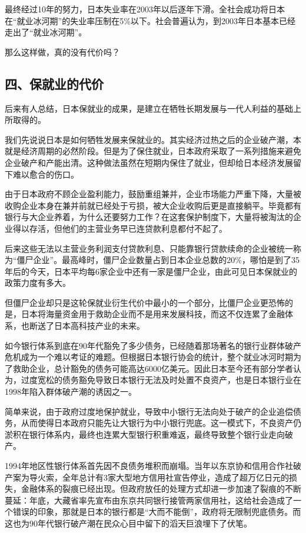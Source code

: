 最终经过10年的努力，日本失业率在2003年以后逐年下滑。全社会成功将日本在“就业冰河期”的失业率压制在5\%以下。社会普遍认为，到2003年日本基本已经走出了“就业冰河期”。

那么这样做，真的没有代价吗？

\subsection{四、保就业的代价}

后来有人总结，日本保就业的成果，是建立在牺牲长期发展与一代人利益的基础上所取得的。

我们先说说日本是如何牺牲发展来保就业的。其实经济过热之后的企业破产潮，本就是经济周期的必然阶段。但是为了保住就业，日本政府采取了一系列措施来避免企业破产和产能出清。这种做法虽然在短期内保住了就业，但却给日本经济发展留下难以愈合的伤口。

由于日本政府不顾企业盈利能力，鼓励重组兼并，企业市场能力严重下降，大量被收购企业本身在兼并前就已经处于亏损，被大企业收购后更是直接躺平。毕竟都有银行与大企业养着，为什么还要努力工作？在这套保护制度下，大量将被淘汰的企业得以存活，但他们的主营业务早已连贷款利息都付不起了。

后来这些无法以主营业务利润支付贷款利息、只能靠银行贷款续命的企业被统一称为“僵尸企业”。最高峰时，僵尸企业数量占到日本企业总数的20\%，哪怕是到了35年后的今天，日本平均每6家企业中还有一家是僵尸企业，由此可见日本保就业的政策力度有多大。

但僵尸企业却只是这轮保就业衍生代价中最小的一个部分，比僵尸企业更恐怖的是，日本将海量资金用于救助企业而不是用来发展科技，而这不仅连累了金融体系，也断送了日本高科技产业的未来。

如今银行体系到底在90年代豁免了多少债务，已经随着那场著名的银行业群体破产危机成为一个难以考证的难题。但根据日本银行协会的统计，整个就业冰河时期为了救助企业，总计豁免的债务可能高达6000亿美元。因此日本至今还有部分学者认为，过度宽松的债务豁免导致日本银行无法及时处置不良资产，也是日本银行业在1998年陷入群体破产潮的诱因之一。

简单来说，由于政府过度地保护就业，导致中小银行无法向处于破产的企业追偿债务，从而使得日本政府只能先让大银行为中小银行兜底。这一模式下，不良资产仍淤积在银行体系内，最终也连累大型银行积重难返，最终导致整个银行业走向破产。

1994年地区性银行体系首先因不良债务堆积而崩塌。当年以东京协和信用合作社破产案为导火索，全年总计有3家大型地方信用社宣告停业，造成了超万亿日元的损失，金融体系的裂痕已经出现。但政府放任的处理方式却进一步加速了裂痕的不断蔓延：年底，大藏省率先宣布由东京共同银行接管两家信用社，这给社会造成了一个错误的印象，那就是日本的银行都是“大而不能倒”，政府将无限制兜底债务。而这也为90年代银行破产潮在民众心目中留下的滔天巨浪埋下了伏笔。

